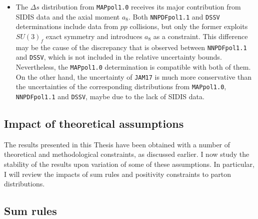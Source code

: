 \begin{itemize}
  \item The $\Delta s$ distribution from \texttt{MAPpol1.0} receives its major contribution from SIDIS data and the axial moment $a_8$. Both \texttt{NNPDFpol1.1} and \texttt{DSSV} determinations include data from $pp$ collisions, but only the former exploits $SU(3)_f$ exact symmetry and introduces $a_8$ as a constraint. This difference may be the cause of the discrepancy that is observed between \texttt{NNPDFpol1.1} and \texttt{DSSV}, which is not included in the relative uncertainty bounds. Nevertheless, the \texttt{MAPpol1.0} determination is compatible with both of them. On the other hand, the uncertainty of \texttt{JAM17} is much more conservative than the uncertainties of the corresponding distributions from \texttt{MAPpol1.0}, \texttt{NNPDFpol1.1} and \texttt{DSSV}, maybe due to the lack of SIDIS data.
\end{itemize}

\subsection{Impact of theoretical assumptions}
The results presented in this Thesis have been obtained with a number of theoretical and methodological constraints, as discussed earlier. I now study the stability of the results upon variation of some of these assumptions. In particular, I will review the impacts of sum rules and positivity constraints to parton distributions. 

\subsection*{Sum rules}

